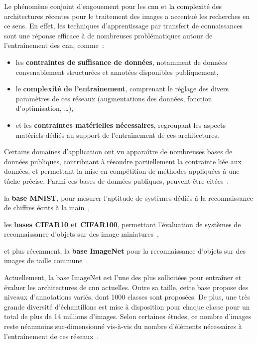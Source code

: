 Le phénomène conjoint d'engouement pour les \gls{cnn} et la complexité des architectures récentes pour le traitement des images a accentué les recherches en ce sens. En effet, les techniques d'apprentissage par transfert de connaissances sont une réponse efficace à de nombreuses problématiques autour de l'entraînement des \gls{cnn}, comme~:~
\begin{itemize}
    \item les \textbf{contraintes de suffisance de données}, notamment de données convenablement structurées et annotées disponibles publiquement,
    \item le \textbf{complexité de l'entraînement}, comprenant le réglage des divers paramètres de ces réseaux (augmentations des données, fonction d'optimisation, \ldots),
    \item et les \textbf{contraintes matérielles nécessaires}, regroupant les aspects matériels dédiés au support de l'entraînement de ces architectures.
\end{itemize}\par

Certains domaines d'application ont vu apparaître de nombreuses bases de données publiques, contribuant à résoudre partiellement la contrainte liée aux données, et permettant la mise en compétition de méthodes appliquées à une tâche précise. Parmi ces bases de données publiques, peuvent être citées~:~
\begin{inlinerate}
    \item la \textbf{base MNIST}, pour mesurer l'aptitude de systèmes dédiés à la reconnaissance de chiffres écrits à la main~\cite{lecun2010},
    \item les \textbf{bases CIFAR10 et CIFAR100}, permettant l'évaluation de systèmes de reconnaissance d'objets sur des image miniatures~\cite{Krizhevsky}, 
    \item et plus récemment, la \textbf{base ImageNet} pour la reconnaissance d'objets sur des images de taille commune~\cite{Deng2009}. 
\end{inlinerate}\par

Actuellement, la base ImageNet est l'une des plus sollicitées pour entraîner et évaluer les architectures de \gls{cnn} actuelles. Outre sa taille, cette base propose des niveaux d'annotations variés, dont 1000 classes sont proposées. De plus, une très grande diversité d'échantillons est mise à disposition pour chaque classe pour un total de plus de 14 millions d'images. Selon certaines études, ce nombre d'images reste néanmoins sur-dimensionné vis-à-vis du nombre d'éléments nécessaires à l'entraînement de ces réseaux~\cite{Huh2016}.\par

